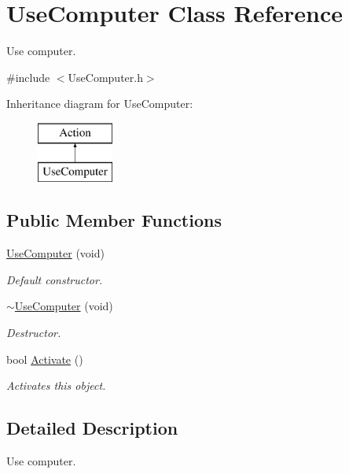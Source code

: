 \hypertarget{class_use_computer}{\section{Use\-Computer Class Reference}
\label{class_use_computer}
}


Use computer.  




{\ttfamily \#include $<$Use\-Computer.\-h$>$}

Inheritance diagram for Use\-Computer\-:\begin{figure}[H]
\begin{center}
\leavevmode
\includegraphics[height=2.000000cm]{class_use_computer}
\end{center}
\end{figure}
\subsection*{Public Member Functions}
\begin{DoxyCompactItemize}
\item 
\hyperlink{class_use_computer_a54797cbaae3ce098f91540d548518a1d}{Use\-Computer} (void)
\begin{DoxyCompactList}\small\item\em Default constructor. \end{DoxyCompactList}\item 
\hyperlink{class_use_computer_a7d2d5695d2e44354885449acecc9ccd9}{$\sim$\-Use\-Computer} (void)
\begin{DoxyCompactList}\small\item\em Destructor. \end{DoxyCompactList}\item 
bool \hyperlink{class_use_computer_aaf6ac208d69b137163324657dd97cf10}{Activate} ()
\begin{DoxyCompactList}\small\item\em Activates this object. \end{DoxyCompactList}\end{DoxyCompactItemize}


\subsection{Detailed Description}
Use computer. 

